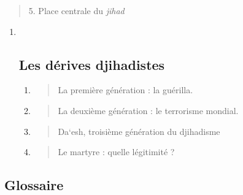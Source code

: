 \begin{quote}
5. Place centrale du \emph{jihad}
\end{quote}

\begin{enumerate}
\def\labelenumi{\Roman{enumi}.}
\setcounter{enumi}{1}
\item ~
  \hypertarget{les-duxe9rives-djihadistes}{%
  \subsection{\texorpdfstring{{Les dérives
  djihadistes}}{Les dérives djihadistes}}\label{les-duxe9rives-djihadistes}}

  \begin{enumerate}
  \def\labelenumii{\arabic{enumii}.}
  \item
    \begin{quote}
    La première génération : la guérilla.
    \end{quote}
  \item
    \begin{quote}
    La deuxième génération : le terrorisme mondial.
    \end{quote}
  \item
    \begin{quote}
    Da`esh, troisième génération du djihadisme
    \end{quote}
  \item
    \begin{quote}
    Le martyre : quelle légitimité ?
    \end{quote}
  \end{enumerate}
\end{enumerate}

\hypertarget{glossaire-4}{%
\subsection{\texorpdfstring{{Glossaire}}{Glossaire}}\label{glossaire-4}}

